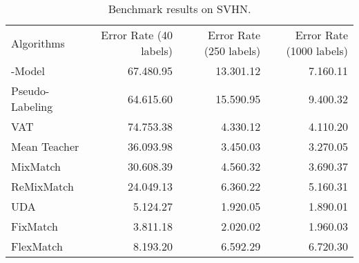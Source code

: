 \begin{table}[t!]
\centering
\caption{Benchmark results on SVHN. }
\label{tb-benchmark-svhn}
\begin{adjustbox}{width=\columnwidth,center}
\begin{tabular}{lrrr}
\toprule
Algorithms & Error Rate (40 labels) & Error Rate (250 labels) & Error Rate (1000 labels) \\  \cmidrule(r){1-1} \cmidrule(l){2-2} \cmidrule(l){3-3} \cmidrule(l){4-4}
-Model~\citep{rasmus2015semi}  &67.48{\scriptsize 0.95}  &13.30{\scriptsize 1.12} &7.16{\scriptsize 0.11}   \\ 

Pseudo-Labeling~\citep{lee2013pseudo}  & 64.61{\scriptsize 5.60} & 15.59{\scriptsize 0.95} & 9.40{\scriptsize 0.32}  \\

VAT~\citep{miyato2018virtual}&74.75{\scriptsize 3.38}  &4.33{\scriptsize 0.12} &4.11{\scriptsize 0.20}  \\

Mean Teacher~\citep{tarvainen2017mean} &36.09{\scriptsize 3.98} &3.45{\scriptsize 0.03} &3.27{\scriptsize 0.05}  \\ 

MixMatch~\citep{berthelot2019mixmatch}   &30.60{\scriptsize 8.39} &4.56{\scriptsize 0.32}  &3.69{\scriptsize 0.37}  \\ 

ReMixMatch~\citep{berthelot2019remixmatch} &24.04{\scriptsize 9.13} &6.36{\scriptsize 0.22} &5.16{\scriptsize 0.31}    \\

UDA~\citep{xie2020unsupervised} & 5.12{\scriptsize 4.27} &1.92{\scriptsize 0.05} &1.89{\scriptsize 0.01}    \\

FixMatch~\citep{sohn2020fixmatch} & 3.81{\scriptsize 1.18} &2.02{\scriptsize 0.02}& 1.96{\scriptsize 0.03}      \\
FlexMatch           & 8.19{\scriptsize 3.20}  & 6.59{\scriptsize 2.29}  & 6.72{\scriptsize 0.30}   \\   \bottomrule
\end{tabular}
\end{adjustbox}
\end{table}


















\paragraph{}






































